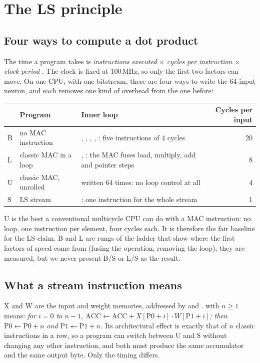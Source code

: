 \section{The LS principle}\label{sec:principle}

\subsection{Four ways to compute a dot product}

The time a program takes is \emph{instructions executed} $\times$ \emph{cycles per instruction} $\times$ \emph{clock period} \citep{patterson2021cod,harris2013ddca}. The clock is fixed at 100\,MHz, so only the first two factors can move. On one CPU, with one bitstream, there are four ways to write the 64-input neuron, and each removes one kind of overhead from the one before:

\begin{center}\small
\begin{tabularx}{\linewidth}{@{}l l L r@{}}
\toprule
& Program & Inner loop & Cycles per input \\
\midrule
B & no MAC instruction & , , , , : five instructions of 4 cycles & 20 \\
L & classic MAC in a loop & , : the MAC fuses load, multiply, add and pointer steps & 8 \\
U & classic MAC, unrolled &  written 64 times: no loop control at all & 4 \\
S & LS stream & : one instruction for the whole stream & 1 \\
\bottomrule
\end{tabularx}
\end{center}

U is the best a conventional multicycle CPU can do with a MAC instruction: no loop, one instruction per element, four cycles each. It is therefore the fair baseline for the LS claim. B and L are rungs of the ladder that show where the first factors of speed come from (fusing the operation, removing the loop); they are measured, but we never present B/S or L/S as the result.

\subsection{What a stream instruction means}

X and W are the input and weight memories, addressed by  and .  with $n \ge 1$ means: \emph{for $i = 0$ to $n-1$, $\mathrm{ACC} \gets \mathrm{ACC} + X[\mathrm{P0} + i] \cdot W[\mathrm{P1} + i]$; then $\mathrm{P0} \gets \mathrm{P0} + n$ and $\mathrm{P1} \gets \mathrm{P1} + n$.} Its architectural effect is exactly that of $n$ classic  instructions in a row, so a program can switch between U and S without changing any other instruction, and both must produce the same accumulator and the same output byte. Only the timing differs.

